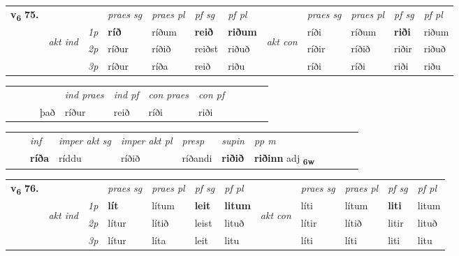 \begin{tabular}{llllllllllll} \toprule
\multirow{4}{*}{{{\textbf{v{\textsubscript{6}}} \Large{\textbf{75.}}}}}  & &   &  \textit{praes sg}  & \textit{praes pl}  &\textit{ pf sg} & \textit{pf pl} &  &  \textit{praes sg}  & \textit{praes pl}  & \textit{pf sg} & \textit{pf pl } \\*
	\cmidrule{4-7} \cmidrule{9-12}
 & \multirow{3}{*}{\begin{turn}{90}\textit{akt ind}\end{turn}} & {\textit{1p}} & \textbf{ríð} & ríðum    & \textbf{reið} & \textbf{riðum} & \multirow{3}{*}{\begin{turn}{90}\textit{akt con}\end{turn}} &ríði & ríðum & \textbf{riði} & riðum\\*
& &  {\textit{2p}} &  ríður  & ríðið   & reiðst & riðuð & & ríðir & ríðið & riðir & riðuð \\*
& &  {\textit{3p}} & ríður & ríða   & reið & riðu & & ríði & ríði& riði & riðu  \\*
\cmidrule{4-7} \cmidrule{9-12}
\end{tabular}


\begin{tabular}{llllllllllll}
 & &  & &  \textit{ind praes} & \textit{ind pf} & \textit{con praes} & \textit{con pf} \\*
&  & & það & ríður & reið & ríði & riði \\*
\cmidrule{5-9}
\end{tabular}


\begin{tabular}{llllllllllll}
 & & \textit{inf} & \textit{imper akt sg} & \textit{imper akt pl}   & \textit{presp} & \textit{supin}  & \textit{pp m}     \\*
  & & \textbf{ríða} & ríddu  & ríðið   & ríðandi &  \textbf{riðið}  & \textbf{riðinn} adj \textbf{\textsubscript{6w}} \\*
\cmidrule{1-12}
\end{tabular}



\begin{tabular}{llllllllllll} \toprule
\multirow{4}{*}{{{\textbf{v{\textsubscript{6}}} \Large{\textbf{76.}}}}}  & &   &  \textit{praes sg}  & \textit{praes pl}  &\textit{ pf sg} & \textit{pf pl} &  &  \textit{praes sg}  & \textit{praes pl}  & \textit{pf sg} & \textit{pf pl } \\*
	\cmidrule{4-7} \cmidrule{9-12}
 & \multirow{3}{*}{\begin{turn}{90}\textit{akt ind}\end{turn}} & {\textit{1p}} & \textbf{lít} & lítum    & \textbf{leit} & \textbf{litum} & \multirow{3}{*}{\begin{turn}{90}\textit{akt con}\end{turn}} &líti & lítum & \textbf{liti} & litum\\*
& &  {\textit{2p}} &  lítur  & lítið   & leist & lituð & & lítir & lítið & litir & lituð \\*
& &  {\textit{3p}} & lítur & líta   & leit & litu & & líti & líti& liti & litu  \\*
\cmidrule{4-7} \cmidrule{9-12}
\end{tabular}


